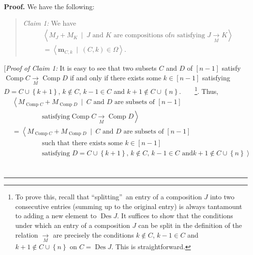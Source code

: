 \documentclass[numbers=enddot,12pt,final,onecolumn,notitlepage]{scrartcl}%
\theoremstyle{definition}
\newenvironment{statement}{\begin{quote}}{\end{quote}}
\newenvironment{proof}[1][Proof]{\noindent\textbf{#1.} }{\ \rule{0.5em}{0.5em}}
\newenvironment{verlong}{}{}
\begin{document}
\begin{verlong}
\begin{proof}
We have the following:

\begin{statement}
\textit{Claim 1:} We have%
\begin{align*}
&  \left\langle M_{J}+M_{K}\ \mid\ J\text{ and }K\text{ are compositions of
}n\text{ satisfying }J\underset{M}{\rightarrow}K\right\rangle \\
&  =\left\langle \mathbf{m}_{C,k}\ \mid\ \left(  C,k\right)  \in
\Omega\right\rangle .
\end{align*}

\end{statement}

[\textit{Proof of Claim 1:} It is easy to see that two subsets $C$ and $D$ of
$\left[  n-1\right]  $ satisfy $\operatorname*{Comp}C\underset{M}{\rightarrow
}\operatorname*{Comp}D$ if and only if there exists some $k\in\left[
n-1\right]  $ satisfying $D=C\cup\left\{  k+1\right\}  $, $k\notin C$, $k-1\in
C$ and $k+1\notin C\cup\left\{  n\right\}  $.\ \ \ \ \footnote{To prove this,
recall that \textquotedblleft splitting\textquotedblright\ an entry of a
composition $J$ into two consecutive entries (summing up to the original
entry) is always tantamount to adding a new element to $\operatorname*{Des}J$.
It suffices to show that the conditions under which an entry of a composition
$J$ can be split in the definition of the relation $\underset{M}{\rightarrow}$
are precisely the conditions $k\notin C$, $k-1\in C$ and $k+1\notin
C\cup\left\{  n\right\}  $ on $C=\operatorname*{Des}J$. This is
straightforward.}. Thus,%
\begin{align*}
&  \left\langle M_{\operatorname*{Comp}C}+M_{\operatorname*{Comp}D}%
\ \mid\ C\text{ and }D\text{ are subsets of }\left[  n-1\right]  \right. \\
&  \ \ \ \ \ \ \ \ \ \ \ \ \ \ \ \ \ \ \ \ \left.  \text{satisfying
}\operatorname*{Comp}C\underset{M}{\rightarrow}\operatorname*{Comp}%
D\right\rangle \\
&  =\left\langle M_{\operatorname*{Comp}C}+M_{\operatorname*{Comp}D}%
\ \mid\ C\text{ and }D\text{ are subsets of }\left[  n-1\right]  \right. \\
&  \ \ \ \ \ \ \ \ \ \ \ \ \ \ \ \ \ \ \ \ \left.  \text{such that there
exists some }k\in\left[  n-1\right]  \right. \\
&  \ \ \ \ \ \ \ \ \ \ \ \ \ \ \ \ \ \ \ \ \left.  \text{satisfying }%
D=C\cup\left\{  k+1\right\}  \text{, }k\notin C\text{, }k-1\in C\text{ and
}k+1\notin C\cup\left\{  n\right\}  \right\rangle \\

\end{align*}
\end{proof}
\end{verlong}
\end{document}
